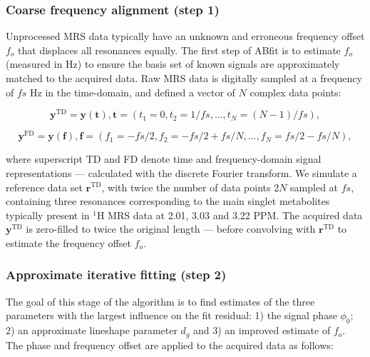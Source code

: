 \documentclass[num-refs]{wiley-article}
\begin{document}
\subsubsection{Coarse frequency alignment (step 1)}
Unprocessed MRS data typically have an unknown and erroneous frequency offset $f_{o}$ that displaces all resonances equally. The first step of ABfit is to estimate $f_{o}$ (measured in Hz) to ensure the basis set of known signals are approximately matched to the acquired data. Raw MRS data is digitally sampled at a frequency of $\mathit{fs}$ Hz in the time-domain, and defined a vector of $N$ complex data points:

\begin{equation}
  \mathbf{y}^{\mathrm{TD}} = \mathbf{y}(\mathbf{t}), \mathbf{t}=(t_{1}=0,t_{2} =1/\mathit{fs},\ldots,t_{N}=(N-1)/\mathit{fs}),
\end{equation}

\begin{equation}
  \mathbf{y}^{\mathrm{FD}} = \mathbf{y}(\mathbf{f}), \mathbf{f}=(f_{1}=-\mathit{fs}/2,f_{2} =-\mathit{fs}/2 + \mathit{fs}/N ,\ldots,f_{N}=\mathit{fs}/2 - \mathit{fs}/N),
\end{equation}

where superscript TD and FD denote time and frequency-domain signal representations --- calculated with the discrete Fourier transform. We simulate a reference data set $\mathbf{r}^{\mathrm{TD}}$, with twice the number of data points $2N$ sampled at $\mathit{fs}$, containing three resonances corresponding to the main singlet metabolites typically present in $^1\mathrm{H}$ MRS data at 2.01, 3.03 and 3.22 PPM. The acquired data $\mathbf{y}^{\mathrm{TD}}$ is zero-filled to twice the original length --- before convolving with  $\mathbf{r}^{\mathrm{TD}}$ to estimate the frequency offset $f_{o}$.


\subsubsection{Approximate iterative fitting (step 2)}
The goal of this stage of the algorithm is to find estimates of the three parameters with the largest influence on the fit residual: 1) the signal phase $\phi_{0}$; 2) an approximate lineshape parameter $d_{g}$ and 3) an improved estimate of $f_{o}$. The phase and frequency offset are applied to the acquired data as follows:
\end{document}
